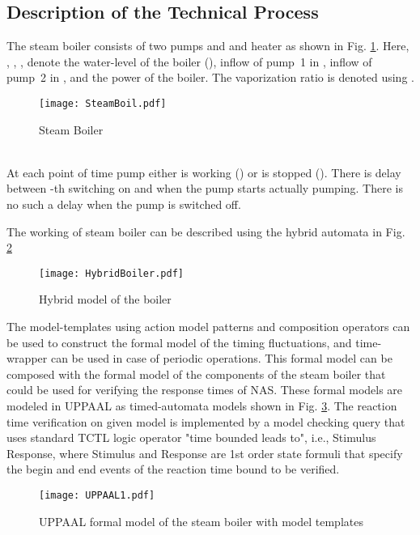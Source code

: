 \documentclass[letterpaper, 10 pt, conference]{ieeeconf}
\begin{document}
\subsection{Description of the Technical Process}
The steam boiler consists of two pumps  and  and heater as shown in Fig. \ref{Fig:SteamBoiler}. Here, , , ,  denote the water-level of the boiler (), inflow of pump~1 in , inflow of pump~2 in , and the power of the boiler. The vaporization ratio is denoted using . 
\begin{figure}[h]
\centering
\texttt{[image: SteamBoil.pdf]}
\caption{Steam Boiler}
\label{Fig:SteamBoiler}
\end{figure}

\\
At each point of time  pump  either is working () or is stopped (). There is delay  between  -th switching on and when the pump starts actually pumping. There is no such a delay when the pump is switched off.

The working of steam boiler can be described using the hybrid automata in Fig. \ref{Fig:HybBoiler}

\begin{figure}[h]
\centering
\texttt{[image: HybridBoiler.pdf]}
\caption{Hybrid model of the boiler}
\label{Fig:HybBoiler}
\end{figure}

The model-templates using action model patterns and composition operators can be used to construct the formal model of the timing fluctuations, and time-wrapper can be used in case of periodic operations. This formal model can be composed with the formal model of the components of the steam boiler that could be used for verifying the response times of NAS. These formal models are modeled in UPPAAL as timed-automata \cite{Beng2004} models  shown in Fig. \ref{Fig:result1}. The reaction time verification on given model is implemented by a model checking query that uses standard TCTL logic operator "time bounded leads to", i.e.,  Stimulus  Response, where Stimulus and Response are 1st order state formuli that specify the begin and end events of the reaction time bound  to be verified.

\begin{figure}[h]
\centering
\texttt{[image: UPPAAL1.pdf]}
\caption{UPPAAL formal model of the steam boiler with model templates}
\label{Fig:result1}
\end{figure}
\end{document}
